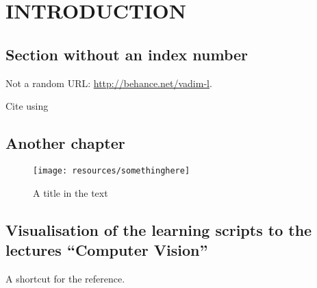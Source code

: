 \chapter*{\MakeUppercase{Introduction}}


\section*{Section without an index number}
Not a random URL: \url{http://behance.net/vadim-l}.

Cite using \cite{Egenfeldt-Nielsen:2007fp}

\section*{Another chapter}


\begin{wrapfigure}{r}{0.36\textwidth} %
	\vspace{-24pt}
	\begin{center}
		\texttt{[image: resources/somethinghere]}
	\end{center}
	\vspace{-12pt}
	\caption[Short name for the list of figures, should not contain cites]{A title in the text}
	\vspace{-12pt}
\end{wrapfigure}

\section*{Visualisation of the learning scripts to the lectures ``Computer Vision''}
\label{sec:pdf-reader_intro}
A shortcut for the reference.